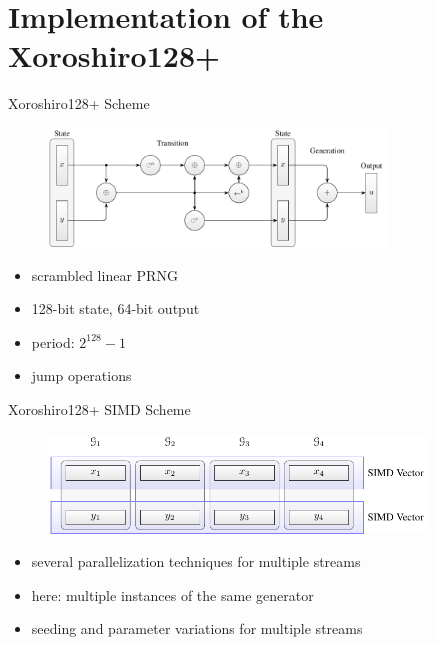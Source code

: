 \documentclass[aspectratio=169]{beamer}
\begin{document}
  \section{Implementation of the Xoroshiro128+} %
  \label{sec:implementation}
    \begin{frame}{Xoroshiro128+ Scheme}
      \begin{figure}
        \includegraphics[width=0.8\textwidth]{figures/xrsr128p_scheme.pdf}
      \end{figure}
      \bigskip
      \begin{minipage}{0.5\textwidth}
        \begin{itemize}
          \pause
          \item scrambled linear PRNG
          \pause
          \item 128-bit state, 64-bit output
        \end{itemize}
      \end{minipage}
      \hfill
      \begin{minipage}{0.49\textwidth}
        \begin{itemize}
          \pause
          \item period: $2^{128}-1$
          \pause
          \item jump operations
        \end{itemize}
      \end{minipage}
    \end{frame}

    \begin{frame}{Xoroshiro128+ SIMD Scheme}
      \begin{figure}
        \includegraphics[width=0.9\textwidth]{figures/xrsr128p_vector_layout.pdf}
      \end{figure}
      \begin{itemize}
        \pause
        \item several parallelization techniques for multiple streams
        \pause
        \item here: multiple instances of the same generator
        \pause
        \item seeding and parameter variations for multiple streams
      \end{itemize}
    \end{frame}
\end{document}
